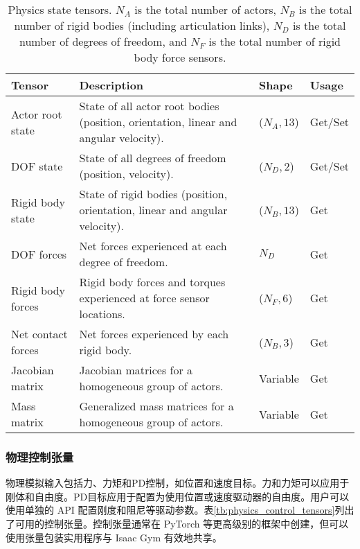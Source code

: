 \begin{table}
  \centering
  \begin{threeparttable}[c]
    \caption[Physics state tensors.]{Physics state tensors. $N_A$ is the total number of actors, $N_B$ is the total number of rigid bodies (including articulation links), $N_D$ is the total number of degrees of freedom, and $N_F$ is the total number of rigid body force sensors.}
    \label{tb:physics_state_tensors}
    \begin{tabular}{L{2cm} L{6cm} L{2cm} L{2cm}}
      \toprule 
      Tensor & Description & Shape & Usage \\
      \midrule 
      Actor root state & State of all actor root bodies (position, orientation, linear and angular velocity). & ($N_A, 13$) & Get/Set\\ \midrule
      DOF state & State of all degrees of freedom (position, velocity). & ($N_D, 2$) & Get/Set\\ \midrule
      Rigid body state & State of rigid bodies (position, orientation, linear and angular velocity). & ($N_B, 13$) & Get\\ \midrule 
      DOF forces & Net forces experienced at each degree of freedom. & $N_D$ & Get\\ \midrule 
      Rigid body forces & Rigid body forces and torques experienced at force sensor locations. & ($N_F, 6$) & Get\\ \midrule 
      Net contact forces & Net forces experienced by each rigid body. & ($N_B, 3$) & Get\\ \midrule 
      Jacobian matrix & Jacobian matrices for a homogeneous group of actors. & Variable & Get\\ \midrule 
      Mass matrix & Generalized mass matrices for a homogeneous group of actors. & Variable & Get\\
      \bottomrule
    \end{tabular}
  \end{threeparttable}
\end{table}


\subsubsection[物理控制张量]{物理控制张量\label{section:physics_control_tensors}}
物理模拟输入包括力、力矩和PD控制，如位置和速度目标。力和力矩可以应用于刚体和自由度。PD目标应用于配置为使用位置或速度驱动器的自由度。用户可以使用单独的 API 配置刚度和阻尼等驱动参数。表\ref{tb:physics_control_tensors}列出了可用的控制张量。控制张量通常在 PyTorch 等更高级别的框架中创建，但可以使用张量包装实用程序与 Isaac Gym 有效地共享。

